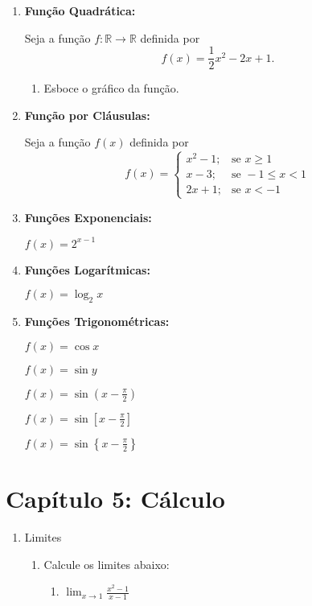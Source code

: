 \documentclass[a4paper, 12pt]{article}
\newcommand{\limite}{\displaystyle\lim}
\begin{document}
\begin{enumerate}
    \item \textbf{Função Quadrática:}
    
    Seja a função \(f:\mathbb{R} \to \mathbb{R}\) definida por 
    \[f(x) = \frac{1}{2} x^2 - 2x + 1.\]
    
    \begin{enumerate}
        \item Esboce o gráfico da função.
    \end{enumerate}
    
    \item \textbf{Função por Cláusulas:}
    
    Seja a função \(f(x)\) definida por
    \[
    f(x) = 
    \begin{cases}
        x^2 - 1; & \textrm{se } x \geq 1 \\
        x - 3; & \textrm{se } -1 \leq x < 1 \\
        2x + 1; & \textrm{se } x < -1
    \end{cases}
    \]
    
    \item \textbf{Funções Exponenciais:}
    
    \(f(x) = 2^{x - 1}\)
    
    \item \textbf{Funções Logarítmicas:}
    
    \(f(x) = \log_2 x\)
    
    \item \textbf{Funções Trigonométricas:}
    
    \(f(x) = \cos x\)
    
    \(f(x) = \sin y\)
    
    \(f(x) = \sin \left(x - \frac{\pi}{2}\right)\)
    
    \(f(x) = \sin \left[x - \frac{\pi}{2}\right]\)
    
    \(f(x) = \sin \left\{x - \frac{\pi}{2}\right\}\)
    
\end{enumerate}


\section*{Capítulo 5: Cálculo}

\begin{enumerate}
    \item Limites
    \begin{enumerate}
        \item Calcule os limites abaixo:
        \begin{enumerate}
            \item $\limite_{x \to 1} \frac{x^2 - 1}{x-1}$
        \end{enumerate}
    \end{enumerate}
\end{enumerate}




\end{document}
